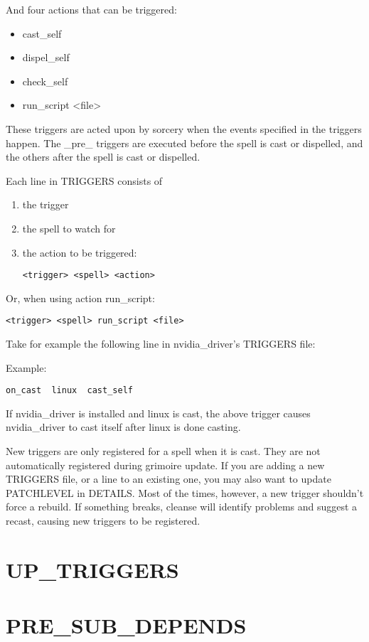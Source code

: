 \documentclass[a4paper,10pt]{book}
\begin{document}
And four actions that can be triggered:
\begin{itemize}
\item cast\_self
\item dispel\_self
\item check\_self
\item run\_script <file>
\end{itemize}

These triggers are acted upon by sorcery when the events specified in the
triggers happen. The \_pre\_ triggers are executed before the spell is cast or
dispelled, and the others after the spell is cast or dispelled.

Each line in TRIGGERS consists of
\begin{enumerate}
\item the trigger
\item the spell to watch for
\item the action to be triggered:
\begin{verbatim}
<trigger> <spell> <action>
\end{verbatim}
\end{enumerate}

Or, when using action run\_script:
\begin{verbatim}
<trigger> <spell> run_script <file>
\end{verbatim}

Take for example the following line in nvidia\_driver's TRIGGERS file:

Example:
\begin{verbatim}
on_cast  linux  cast_self
\end{verbatim}

If nvidia\_driver is installed and linux is cast, the above trigger causes
nvidia\_driver to cast itself after linux is done casting.

New triggers are only registered for a spell when it is cast. They are not
automatically registered during grimoire update. If you are adding a new
TRIGGERS file, or a line to an existing one, you may also want to update
PATCHLEVEL in DETAILS. Most of the times, however, a new trigger shouldn't
force a rebuild. If something breaks, cleanse will identify problems and
suggest a recast, causing new triggers to be registered.

\section{UP\_TRIGGERS}
\section{PRE\_SUB\_DEPENDS}
\end{document}
